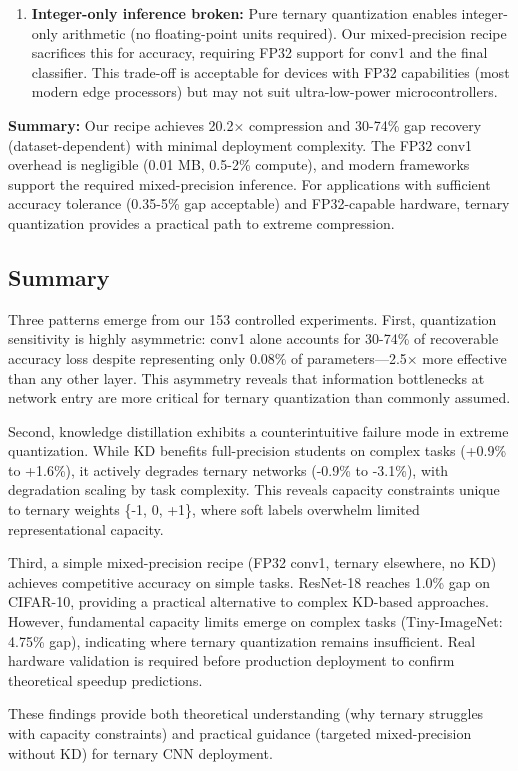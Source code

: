 \begin{enumerate}
    \item \textbf{Integer-only inference broken:} Pure ternary quantization enables integer-only arithmetic (no floating-point units required). Our mixed-precision recipe sacrifices this for accuracy, requiring FP32 support for conv1 and the final classifier. This trade-off is acceptable for devices with FP32 capabilities (most modern edge processors) but may not suit ultra-low-power microcontrollers.
\end{enumerate}

\textbf{Summary:} Our recipe achieves 20.2× compression and 30-74\% gap recovery (dataset-dependent) with minimal deployment complexity. The FP32 conv1 overhead is negligible (0.01 MB, 0.5-2\% compute), and modern frameworks support the required mixed-precision inference. For applications with sufficient accuracy tolerance (0.35-5\% gap acceptable) and FP32-capable hardware, ternary quantization provides a practical path to extreme compression.

\subsection{Summary}

Three patterns emerge from our 153 controlled experiments. First, quantization sensitivity is highly asymmetric: conv1 alone accounts for 30-74\% of recoverable accuracy loss despite representing only 0.08\% of parameters—2.5× more effective than any other layer. This asymmetry reveals that information bottlenecks at network entry are more critical for ternary quantization than commonly assumed.

Second, knowledge distillation exhibits a counterintuitive failure mode in extreme quantization. While KD benefits full-precision students on complex tasks (+0.9\% to +1.6\%), it actively degrades ternary networks (-0.9\% to -3.1\%), with degradation scaling by task complexity. This reveals capacity constraints unique to ternary weights \{-1, 0, +1\}, where soft labels overwhelm limited representational capacity.

Third, a simple mixed-precision recipe (FP32 conv1, ternary elsewhere, no KD) achieves competitive accuracy on simple tasks. ResNet-18 reaches 1.0\% gap on CIFAR-10, providing a practical alternative to complex KD-based approaches. However, fundamental capacity limits emerge on complex tasks (Tiny-ImageNet: 4.75\% gap), indicating where ternary quantization remains insufficient. Real hardware validation is required before production deployment to confirm theoretical speedup predictions.

These findings provide both theoretical understanding (why ternary struggles with capacity constraints) and practical guidance (targeted mixed-precision without KD) for ternary CNN deployment.
